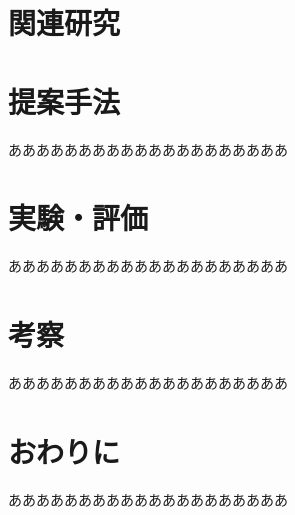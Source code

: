 \documentclass[a4j, 10pt, twocolumn]{ujarticle}
\begin{document}
\section{関連研究}

\section{提案手法}

ああああああああああああああああああああ

\section{実験・評価}

ああああああああああああああああああああ

\section{考察}

ああああああああああああああああああああ

\section{おわりに}

ああああああああああああああああああああ



\end{document}
